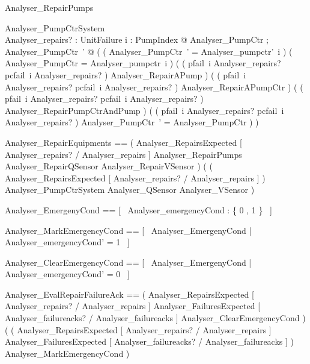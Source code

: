 \documentclass{article}
\begin{document}
\begin{schema}{Analyser\_RepairPumps}

 \Delta Analyser\_PumpCtrSystem \\
 Analyser\_repairs? : \power UnitFailure 
\where
 \forall i : PumpIndex @ \exists Analyser\_PumpCtr ; Analyser\_PumpCtr~' @ ( ( \theta Analyser\_PumpCtr~' = Analyser\_pumpctr'~i ) \land ( \theta Analyser\_PumpCtr = Analyser\_pumpctr~i ) \land ( ( pfail~i \in Analyser\_repairs? \land pcfail~i \notin Analyser\_repairs? ) \implies Analyser\_RepairAPump ) \land ( ( pfail~i \notin Analyser\_repairs? \land pcfail~i \in Analyser\_repairs? ) \implies Analyser\_RepairAPumpCtr ) \land ( ( pfail~i \in Analyser\_repairs? \land pcfail~i \in Analyser\_repairs? ) \implies Analyser\_RepairPumpCtrAndPump ) \land ( ( pfail~i \notin Analyser\_repairs? \land pcfail~i \notin Analyser\_repairs? ) \implies \theta Analyser\_PumpCtr~' = \theta Analyser\_PumpCtr ) )
\end{schema}

\begin{zed}
	Analyser\_RepairEquipments == ( Analyser\_RepairsExpected [ Analyser\_repairs? / Analyser\_repairs ] \land Analyser\_RepairPumps \land Analyser\_RepairQSensor \land Analyser\_RepairVSensor ) \lor ( ( \lnot Analyser\_RepairsExpected [ Analyser\_repairs? / Analyser\_repairs ] ) \land \Xi Analyser\_PumpCtrSystem \land \Xi Analyser\_QSensor \land \Xi Analyser\_VSensor )
\end{zed}

\begin{zed}
	Analyser\_EmergenyCond == [~  Analyser\_emergencyCond : \{ 0 , 1 \}  ~]
\end{zed}

\begin{zed}
	Analyser\_MarkEmergencyCond == [~  \Delta Analyser\_EmergenyCond | Analyser\_emergencyCond' = 1  ~]
\end{zed}

\begin{zed}
	Analyser\_ClearEmergencyCond == [~  \Delta Analyser\_EmergenyCond | Analyser\_emergencyCond' = 0  ~]
\end{zed}

\begin{zed}
	Analyser\_EvalRepairFailureAck == ( Analyser\_RepairsExpected [ Analyser\_repairs? / Analyser\_repairs ] \land Analyser\_FailuresExpected [ Analyser\_failureacks? / Analyser\_failureacks ] \land Analyser\_ClearEmergencyCond ) \lor ( ( \lnot Analyser\_RepairsExpected [ Analyser\_repairs? / Analyser\_repairs ] \lor \lnot Analyser\_FailuresExpected [ Analyser\_failureacks? / Analyser\_failureacks ] ) \land Analyser\_MarkEmergencyCond )
\end{zed}
\end{document}
